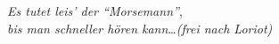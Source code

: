 
\medskip
\textit{Es tutet leis' der ``Morsemann''},\\
\textit{bis man schneller h\"oren kann}\ldots \textit{(frei nach Loriot)}

